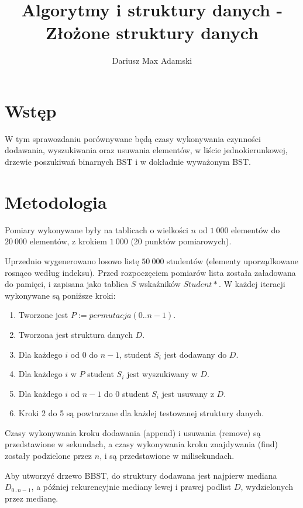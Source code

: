 \documentclass[11pt,twocolumn]{article}
\title{Algorytmy i struktury danych - Złożone struktury danych}
\author{Dariusz Max Adamski}
\date{}
\begin{document}
\maketitle



\section*{Wstęp}

W tym sprawozdaniu porównywane będą czasy wykonywania czynności dodawania, wyszukiwania oraz usuwania elementów, w liście jednokierunkowej, drzewie poszukiwań binarnych BST i w dokładnie wyważonym BST.



\section*{Metodologia}

Pomiary wykonywane były na tablicach o wielkości $n$ od $1\ 000$ elementów do $20\ 000$ elementów, z krokiem $1\ 000$ (20 punktów pomiarowych).

Uprzednio wygenerowano losowo listę $50\ 000$ studentów (elementy uporządkowane rosnąco według indeksu). Przed rozpoczęciem pomiarów lista została załadowana do pamięci, i zapisana jako tablica $S$ wskaźników $Student*$. W każdej iteracji wykonywane są poniższe kroki:

\begin{enumerate}
	\item Tworzone jest $P := permutacja(0..n-1)$.
	\item Tworzona jest struktura danych $D$.
	\item Dla każdego $i$ od $0$ do $n-1$, student $S_i$ jest dodawany do $D$.
	\item Dla każdego $i$ w $P$ student $S_i$ jest wyszukiwany w $D$.
	\item Dla każdego $i$ od $n-1$ do $0$ student $S_i$ jest usuwany z $D$.
	\item Kroki 2 do 5 są powtarzane dla każdej testowanej struktury danych.
\end{enumerate}

Czasy wykonywania kroku dodawania (append) i usuwania (remove) są przedstawione w sekundach, a czasy wykonywania kroku znajdywania (find) zostały podzielone przez $n$, i są przedstawione w milisekundach.

Aby utworzyć drzewo BBST, do struktury dodawana jest najpierw mediana $D_{0..n-1}$, a później rekurencyjnie mediany lewej i prawej podlist $D$, wydzielonych przez medianę.
\end{document}
